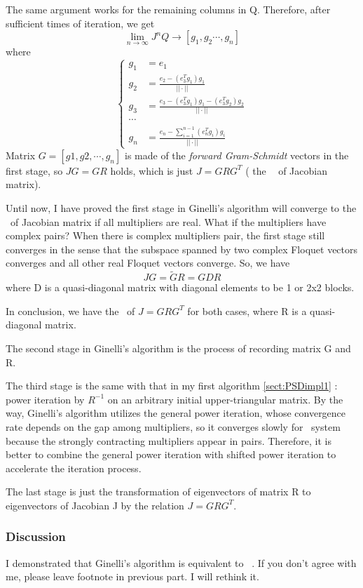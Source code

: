 The same argument works for the remaining columns in Q. Therefore,
after sufficient times of iteration, we get
\[
\lim_{n\to \infty}J^{n}Q\to [g_{1},g_{2}\cdots, g_{n}]
\]
where
\[
\left\{
\begin{aligned}
  g_{1} & = e_{1} \\
  g_{2} & = \frac{e_{2}-(e_{3}^{T}g_{1})g_{1}}{||\cdot ||}\\
  g_{3} & = \frac{e_{3}-(e_{3}^{T}g_{1})g_{1}-
    (e_{3}^{T}g_{2})g_{2}}{||\cdot ||}\\
  \cdots \\
  g_{n} & = \frac{e_{n}-\sum_{i=1}^{n-1}(e_{n}^{T}g_{i})g_{i}}{||\cdot ||}
\end{aligned}
\right.
\]
Matrix $G=[g1,g2,\cdots ,g_{n}]$ is made of the
 \textit{forward Gram-Schmidt} vectors in the first stage, so
$JG=GR$ holds, which is just $J=GRG^{T}$ ( the \textbf{\psd\ }
 of Jacobian matrix).

Until now, I have proved the first stage in Ginelli's algorithm will
converge to the \psd\ of Jacobian matrix if all multipliers are
real. What if the multipliers have complex pairs? When there is
complex multipliers pair, the first stage still converges in the
sense that the subspace spanned by two complex
Floquet vectors converges and all other real Floquet vectors converge.
So, we have
\[
JG=\tilde{G}R=GDR
\]
where D is a quasi-diagonal matrix with diagonal elements to be 1 or 2x2
blocks.

In conclusion, we have the \psd\ of $J=GRG^{T}$ for both cases, where R
is a quasi-diagonal matrix.

The second stage in Ginelli's algorithm is the process of recording
matrix G and R.

The third stage is the same with that in my first algorithm
\ref{sect:PSDimpl1} : power
iteration by  $R^{-1}$ on an arbitrary initial upper-triangular matrix.
By the way, Ginelli's algorithm utilizes the general power iteration,
whose convergence rate depends on the gap among multipliers, so it
converges slowly for \KS\ system because the strongly contracting
multipliers appear in pairs. Therefore, it is better to combine
the general power iteration with shifted power iteration to accelerate
the iteration process.

The last stage is just the transformation of eigenvectors of matrix R to
eigenvectors of Jacobian J by the relation $J=GRG^{T}$.

\subsubsection{Discussion}
I demonstrated that Ginelli's algorithm is equivalent to
\psd\ . If you don't agree with me, please leave footnote in previous
part. I will rethink it.

